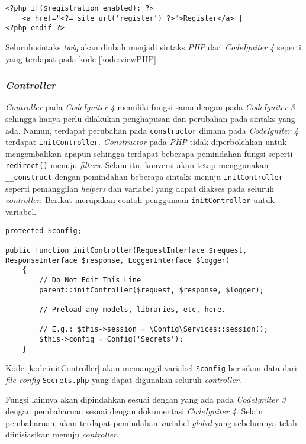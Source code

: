 \begin{lstlisting}[caption=Contoh \textit{view} menggunakan \textit{php}, label=kode:viewPHP]
<?php if($registration_enabled): ?>
	<a href="<?= site_url('register') ?>">Register</a> |
<?php endif ?>
\end{lstlisting}

Seluruh sintaks \textit{twig} akan diubah menjadi sintaks \textit{PHP} dari \textit{CodeIgniter 4} seperti yang terdapat pada kode \ref{kode:viewPHP}.

\subsubsection{\textit{Controller}}
\textit{Controller} pada \textit{CodeIgniter 4} memiliki fungsi sama dengan pada \textit{CodeIgniter 3} sehingga hanya perlu dilakukan penghapusan dan perubahan pada sintaks yang ada. Namun, terdapat perubahan pada \texttt{constructor} dimana pada \textit{CodeIgniter 4} terdapat \texttt{initController}. \textit{Constructor} pada \textit{PHP} tidak diperbolehkan untuk mengembalikan apapun sehingga terdapat beberapa pemindahan fungsi seperti \texttt{redirect()} menuju \textit{filters}. Selain itu, konversi akan tetap menggunakan \verb|__construct| dengan pemindahan beberapa sintaks menuju \texttt{initController} seperti pemanggilan \textit{helpers} dan variabel yang dapat diakses pada seluruh \textit{controller}. Berikut merupakan contoh penggunaan \texttt{initController} untuk variabel.

\begin{lstlisting}[caption=Contoh penggunaan initController untuk variabel, label=kode:initController]
protected $config;

public function initController(RequestInterface $request, ResponseInterface $response, LoggerInterface $logger)
    {
        // Do Not Edit This Line
        parent::initController($request, $response, $logger);

        // Preload any models, libraries, etc, here.

        // E.g.: $this->session = \Config\Services::session();
        $this->config = Config('Secrets');
    }
\end{lstlisting}

Kode \ref{kode:initController} akan memanggil variabel \verb|$config| berisikan data dari \textit{file config} \texttt{Secrets.php} yang dapat digunakan seluruh \textit{controller}.

Fungsi lainnya akan dipindahkan sesuai dengan yang ada pada \textit{CodeIgniter 3} dengan pembaharuan sesuai dengan dokumentasi \textit{CodeIgniter 4}. Selain pembaharuan, akan terdapat pemindahan variabel \textit{global} yang sebelumnya telah diinisiasikan menuju \textit{controller}.

